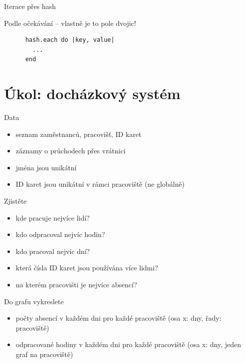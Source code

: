 \documentclass{beamer}
\begin{document}
\begin{frame}[fragile]{Iterace přes hash}
  \begin{block}{Podle očekávání -- vlastně je to pole dvojic!}
    \begin{verbatim}
      hash.each do |key, value|
        ...
      end
    \end{verbatim}
  \end{block}
\end{frame}

\section{Úkol: docházkový systém}

\begin{frame}{Data}
  \begin{itemize}
    \item seznam zaměstnanců, pracovišť, ID karet
    \item záznamy o průchodech přes vrátnici
    \item jména jsou unikátní
    \item ID karet jsou unikátní v rámci pracoviště (ne globálně)
  \end{itemize}
\end{frame}

\begin{frame}{Zjistěte}
  \begin{itemize}
    \item kde pracuje nejvíce lidí?
    \item kdo odpracoval nejvíc hodin?
    \item kdo pracoval nejvíc dní?
    \item která čísla ID karet jsou používána více lidmi?
    \item na kterém pracovišti je nejvíce absencí?
  \end{itemize}
\end{frame}

\begin{frame}{Do grafu vykreslete}
  \begin{itemize}
    \item počty absencí v každém dni pro každé pracoviště (osa x: dny, řady: pracoviště)
    \item odpracované hodiny v každém dni pro každé pracoviště (osa x: dny, jeden graf na pracoviště)
  \end{itemize}
\end{frame}
\end{document}
